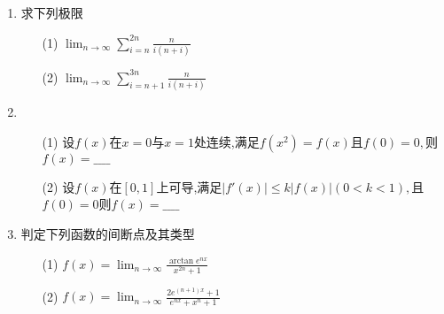 \documentclass[12pt, a4paper, oneside, UTF8]{ctexbook}
\begin{document}
\begin{enumerate}
    \newpage
    
    \item 求下列极限
    \begin{enumerate}
        \item [(1)] $\lim_{n\to\infty}\sum_{i=n}^{2n}\frac{n}{i(n+i)}$
        \item [(2)] $\lim_{n\to\infty}\sum_{i=n+1}^{3n}\frac{n}{i(n+i)}$
    \end{enumerate}
    
    \newpage
    
    \item 
    \begin{enumerate}
        \item [(1)] 设$f(x)$在$x=0$与$x=1$处连续,满足$f(x^2)=f(x)$且$f(0)=0,$则$f(x)=\_\_\_\_$
        \item [(2)] 设$f(x)$在$[0,1]$上可导,满足$\left|f'(x)\right|\leq k\left|f(x)\right|(0<k<1),$且$f(0)=0$则$f(x)=\_\_\_\_$
    \end{enumerate}
    
    \newpage
    
    \item 判定下列函数的间断点及其类型
    \begin{enumerate}
        \item [(1)] $f(x)=\lim_{n\to\infty}\frac{\arctan{e^{nx}}}{x^{2n}+1}$
        \item [(2)] $f(x)=\lim_{n\to\infty}\frac{2e^{(n+1)x}+1}{e^{nx}+x^n+1}$
    \end{enumerate}
    
    \newpage
    
\end{enumerate}
\ifx\allfiles\undefined
\end{document}
